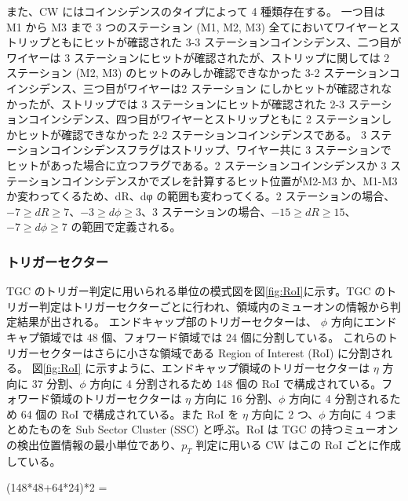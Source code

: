 また、CW にはコインシデンスのタイプによって 4 種類存在する。
一つ目は M1 から M3 まで 3 つのステーション (M1, M2, M3) 全てにおいてワイヤーとストリップともにヒットが確認された 3-3 ステーションコインシデンス、二つ目がワイヤーは 3 ステーションにヒットが確認されたが、ストリップに関しては 2 ステーション (M2, M3) のヒットのみしか確認できなかった 3-2 ステーションコインシデンス、三つ目がワイヤーは2 ステーション  にしかヒットが確認されなかったが、ストリップでは 3 ステーションにヒットが確認された 2-3 ステーションコインシデンス、四つ目がワイヤーとストリップともに 2 ステーションしかヒットが確認できなかった 2-2 ステーションコインシデンスである。
3 ステーションコインシデンスフラグはストリップ、ワイヤー共に 3 ステーションでヒットがあった場合に立つフラグである。2 ステーションコインシデンスか 3 ステーションコインシデンスかでズレを計算するヒット位置がM2-M3 か、M1-M3 か変わってくるため、dR、dφ の範囲も変わってくる。2 ステーションの場合、$−7 \geq dR \geq 7$、$−3 \geq d\phi \geq 3$、3 ステーションの場合、$−15 \geq dR \geq 15$、$−7 \geq d\phi \geq 7$ の範囲で定義される。


\subsubsection{トリガーセクター}
TGC のトリガー判定に用いられる単位の模式図を図\ref{fig:RoI}に示す。TGC のトリガー判定はトリガーセクターごとに行われ、領域内のミューオンの情報から判定結果が出される。
エンドキャップ部のトリガーセクターは、 $\phi$ 方向にエンドキャプ領域では 48 個、フォワード領域では 24 個に分割している。
これらのトリガーセクターはさらに小さな領域である Region of Interest (RoI) に分割される。
図\ref{fig:RoI} に示すように、エンドキャップ領域のトリガーセクターは $\eta$ 方向に 37 分割、$\phi$ 方向に 4 分割されるため 148 個の RoI で構成されている。フォワード領域のトリガーセクターは $\eta$ 方向に 16 分割、$\phi$ 方向に 4 分割されるため 64 個の RoI で構成されている。また RoI を $\eta$ 方向に 2 つ、$\phi$ 方向に 4 つまとめたものを Sub Sector Cluster (SSC) と呼ぶ。RoI は TGC の持つミューオンの検出位置情報の最小単位であり、$p_T$ 判定に用いる CW はこの RoI ごとに作成している。

(148*48+64*24)*2 = 

